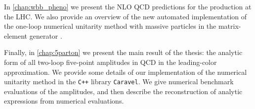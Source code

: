 In \cref{chap:wbb_pheno} we present the NLO QCD predictions for the \Wbbn{} production at the LHC.
We also provide an overview of the new automated implementation of the one-loop numerical unitarity method with massive particles in the matrix-element generator \BlackHat{}.

Finally, in \cref{chap:5parton} we present the main result of the thesis: the analytic form of all two-loop five-point amplitudes in QCD in the leading-color approximation.
We provide some details of our implementation of the numerical unitarity method in the \texttt{C++} library \texttt{Caravel}.
We give numerical benchmark evaluations of the amplitudes, 
and then describe the reconstruction of analytic expressions from numerical evaluations.
